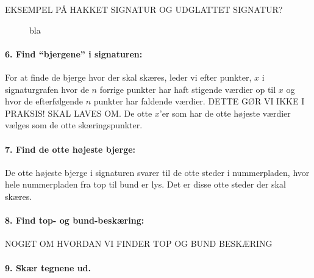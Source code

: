 EKSEMPEL PÅ HAKKET SIGNATUR OG UDGLATTET SIGNATUR?

\begin{figure}[htp]
\centering
{} 
\caption{bla}
\label{fig:smoothSig}
\end{figure}

\paragraph{6. Find ``bjergene'' i signaturen:}
For at finde de bjerge hvor der skal skæres, leder vi efter punkter, $x$ i signaturgrafen hvor de $n$ forrige punkter har haft stigende værdier op til $x$ og hvor de efterfølgende $n$ punkter har faldende værdier. DETTE GØR VI IKKE I PRAKSIS! SKAL LAVES OM. De otte $x$'er som har de otte højeste værdier vælges som de otte skæringspunkter.

\paragraph{7. Find de otte højeste bjerge:}
De otte højeste bjerge i signaturen svarer til de otte steder i nummerpladen, hvor hele nummerpladen fra top til bund er lys. Det er disse otte steder der skal skæres.

\paragraph{8. Find top- og bund-beskæring:}
NOGET OM HVORDAN VI FINDER TOP OG BUND BESKÆRING

\paragraph{9. Skær tegnene ud.}


